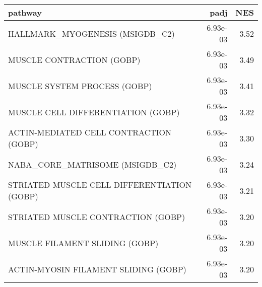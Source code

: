 \begin{tabular}{lrr}
\toprule
                                     pathway &      padj &   NES \\
\midrule
             HALLMARK\_MYOGENESIS (MSIGDB\_C2) &  6.93e-03 &  3.52 \\
                   MUSCLE CONTRACTION (GOBP) &  6.93e-03 &  3.49 \\
                MUSCLE SYSTEM PROCESS (GOBP) &  6.93e-03 &  3.41 \\
          MUSCLE CELL DIFFERENTIATION (GOBP) &  6.93e-03 &  3.32 \\
      ACTIN-MEDIATED CELL CONTRACTION (GOBP) &  6.93e-03 &  3.30 \\
             NABA\_CORE\_MATRISOME (MSIGDB\_C2) &  6.93e-03 &  3.24 \\
 STRIATED MUSCLE CELL DIFFERENTIATION (GOBP) &  6.93e-03 &  3.21 \\
          STRIATED MUSCLE CONTRACTION (GOBP) &  6.93e-03 &  3.20 \\
              MUSCLE FILAMENT SLIDING (GOBP) &  6.93e-03 &  3.20 \\
        ACTIN-MYOSIN FILAMENT SLIDING (GOBP) &  6.93e-03 &  3.20 \\
\bottomrule
\end{tabular}
